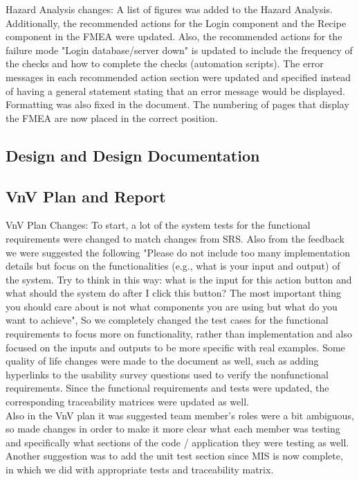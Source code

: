 \documentclass{article}
\begin{document}
Hazard Analysis changes: A list of figures was added to the Hazard Analysis. Additionally, the recommended actions for the Login component and the Recipe component in the FMEA were updated. Also, the recommended actions for the failure mode "Login database/server down" is updated to include the frequency of the checks and how to complete the checks (automation scripts). The error messages in each recommended action section were updated and specified instead of having a general statement stating that an error message would be displayed. Formatting was also fixed in the document. The numbering of pages that display the FMEA are now placed in the correct position. 

\subsection{Design and Design Documentation}

\subsection{VnV Plan and Report}

VnV Plan Changes: To start, a lot of the system tests for the functional requirements were changed to match changes from SRS. Also from the feedback we were suggested the following "Please do not include too many implementation details but focus on the functionalities (e.g., what is your input and output) of the system. Try to think in this way: what is the input for this action button and what should the system do after I click this button? The most important thing you should care about is not what components you are using but what do you want to achieve", So we completely changed the test cases for the functional requirements to focus more on functionality, rather than implementation and also focused on the inputs and outputs to be more specific with real examples. Some quality of life changes were made to the document as well, such as adding hyperlinks to the usability survey questions used to verify the nonfunctional requirements. Since the functional requirements and tests were updated, the corresponding traceability matrices were updated as well. \\

Also in the VnV plan it was suggested team member's roles were a bit ambiguous, so made changes in order to make it more clear what each member was testing and specifically what sections of the code / application they were testing as well. Another suggestion was to add the unit test section since MIS is now complete, in which we did with appropriate tests and traceability matrix.
\end{document}
